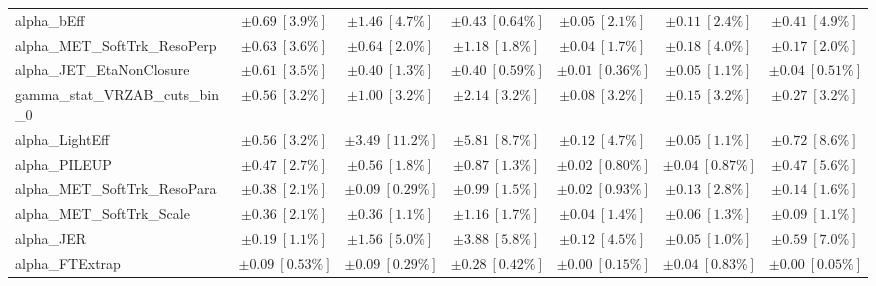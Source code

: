 \begin{sidewaystable}
\begin{center}
\begin{tabular*}{\textwidth}{@{\extracolsep{\fill}}lcccccc}
alpha\_bEff         & $\pm 0.69\ [3.9\%] $          & $\pm 1.46\ [4.7\%] $          & $\pm 0.43\ [0.64\%] $          & $\pm 0.05\ [2.1\%] $          & $\pm 0.11\ [2.4\%] $          & $\pm 0.41\ [4.9\%] $       \\
alpha\_MET\_SoftTrk\_ResoPerp         & $\pm 0.63\ [3.6\%] $          & $\pm 0.64\ [2.0\%] $          & $\pm 1.18\ [1.8\%] $          & $\pm 0.04\ [1.7\%] $          & $\pm 0.18\ [4.0\%] $          & $\pm 0.17\ [2.0\%] $       \\
alpha\_JET\_EtaNonClosure         & $\pm 0.61\ [3.5\%] $          & $\pm 0.40\ [1.3\%] $          & $\pm 0.40\ [0.59\%] $          & $\pm 0.01\ [0.36\%] $          & $\pm 0.05\ [1.1\%] $          & $\pm 0.04\ [0.51\%] $       \\
gamma\_stat\_VRZAB\_cuts\_bin\_0         & $\pm 0.56\ [3.2\%] $          & $\pm 1.00\ [3.2\%] $          & $\pm 2.14\ [3.2\%] $          & $\pm 0.08\ [3.2\%] $          & $\pm 0.15\ [3.2\%] $          & $\pm 0.27\ [3.2\%] $       \\
alpha\_LightEff         & $\pm 0.56\ [3.2\%] $          & $\pm 3.49\ [11.2\%] $          & $\pm 5.81\ [8.7\%] $          & $\pm 0.12\ [4.7\%] $          & $\pm 0.05\ [1.1\%] $          & $\pm 0.72\ [8.6\%] $       \\
alpha\_PILEUP         & $\pm 0.47\ [2.7\%] $          & $\pm 0.56\ [1.8\%] $          & $\pm 0.87\ [1.3\%] $          & $\pm 0.02\ [0.80\%] $          & $\pm 0.04\ [0.87\%] $          & $\pm 0.47\ [5.6\%] $       \\
alpha\_MET\_SoftTrk\_ResoPara         & $\pm 0.38\ [2.1\%] $          & $\pm 0.09\ [0.29\%] $          & $\pm 0.99\ [1.5\%] $          & $\pm 0.02\ [0.93\%] $          & $\pm 0.13\ [2.8\%] $          & $\pm 0.14\ [1.6\%] $       \\
alpha\_MET\_SoftTrk\_Scale         & $\pm 0.36\ [2.1\%] $          & $\pm 0.36\ [1.1\%] $          & $\pm 1.16\ [1.7\%] $          & $\pm 0.04\ [1.4\%] $          & $\pm 0.06\ [1.3\%] $          & $\pm 0.09\ [1.1\%] $       \\
alpha\_JER         & $\pm 0.19\ [1.1\%] $          & $\pm 1.56\ [5.0\%] $          & $\pm 3.88\ [5.8\%] $          & $\pm 0.12\ [4.5\%] $          & $\pm 0.05\ [1.0\%] $          & $\pm 0.59\ [7.0\%] $       \\
alpha\_FTExtrap         & $\pm 0.09\ [0.53\%] $          & $\pm 0.09\ [0.29\%] $          & $\pm 0.28\ [0.42\%] $          & $\pm 0.00\ [0.15\%] $          & $\pm 0.04\ [0.83\%] $          & $\pm 0.00\ [0.05\%] $       \\

\end{tabular*}
\end{center}
\end{sidewaystable}
